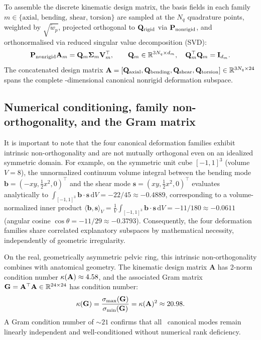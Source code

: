 \documentclass[11pt]{article}
\begin{document}
To assemble the discrete kinematic design matrix, the basis fields in each family $m \in \{\text{axial, bending, shear, torsion}\}$ are sampled at the $N_q$ quadrature points, weighted by $\sqrt{\tilde w_p}$, projected orthogonal to $\mathbf Q_{\rm rigid}$ via $\mathbf P_{\rm nonrigid}$, and orthonormalised via reduced singular value decomposition (SVD):
\begin{equation}
\mathbf P_{\rm nonrigid} \mathbf A_m = \mathbf Q_m \mathbf \Sigma_m \mathbf V_m^\top, \qquad \mathbf Q_m \in \mathbb{R}^{3N_q \times d_m}, \quad \mathbf Q_m^\top \mathbf Q_m = \mathbf I_{d_m}.
\end{equation}
The concatenated design matrix $\mathbf A = [\mathbf Q_{\rm axial}, \mathbf Q_{\rm bending}, \mathbf Q_{\rm shear}, \mathbf Q_{\rm torsion}] \in \mathbb{R}^{3N_q \times 24}$ spans the complete \NonrigidDOFs-dimensional canonical nonrigid deformation subspace.

\subsection{Numerical conditioning, family non-orthogonality, and the Gram matrix}
It is important to note that the four canonical deformation families exhibit intrinsic non-orthogonality and are not mutually orthogonal even on an idealized symmetric domain.
For example, on the symmetric unit cube $[-1, 1]^3$ (volume $V = 8$), the unnormalized continuum volume integral between the bending mode $\mathbf b = (-xy, \frac{1}{2}x^2, 0)^\top$ and the shear mode $\mathbf s = (xy, \frac{1}{2}x^2, 0)^\top$ evaluates analytically to $\int_{[-1, 1]^3} \mathbf b \cdot \mathbf s \, \mathrm dV = -22/45 \approx -0.4889$, corresponding to a volume-normalized inner product $\langle \mathbf b, \mathbf s \rangle_V = \frac{1}{V}\int_{[-1, 1]^3} \mathbf b \cdot \mathbf s \, \mathrm dV = -11/180 \approx -0.0611$ (angular cosine $\cos\theta = -11/29 \approx -0.3793$).
Consequently, the four deformation families share correlated explanatory subspaces by mathematical necessity, independently of geometric irregularity.

On the real, geometrically asymmetric pelvic ring, this intrinsic non-orthogonality combines with anatomical geometry.
The kinematic design matrix $\mathbf A$ has 2-norm condition number $\kappa(\mathbf A) \approx 4.58$, and the associated Gram matrix $\mathbf G = \mathbf A^\top \mathbf A \in \mathbb{R}^{24 \times 24}$ has condition number:
\begin{equation}
\kappa(\mathbf G) = \frac{\sigma_{\max}(\mathbf G)}{\sigma_{\min}(\mathbf G)} = \kappa(\mathbf A)^2 \approx 20.98.
\end{equation}
A Gram condition number of $\sim 21$ confirms that all \NonrigidDOFs\ canonical modes remain linearly independent and well-conditioned without numerical rank deficiency.
\end{document}
